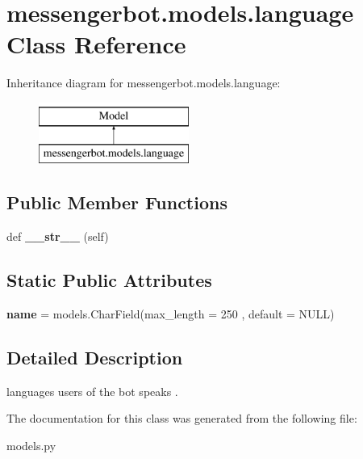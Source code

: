 \hypertarget{classmessengerbot_1_1models_1_1language}{}\section{messengerbot.\+models.\+language Class Reference}
\label{classmessengerbot_1_1models_1_1language}
Inheritance diagram for messengerbot.\+models.\+language\+:\begin{figure}[H]
\begin{center}
\leavevmode
\includegraphics[height=2.000000cm]{classmessengerbot_1_1models_1_1language}
\end{center}
\end{figure}
\subsection*{Public Member Functions}
\begin{DoxyCompactItemize}
\item 
\mbox{\label{classmessengerbot_1_1models_1_1language_a0cb14c023495e985949e8403eb4eca88}} 
def {\bfseries \+\_\+\+\_\+str\+\_\+\+\_\+} (self)
\end{DoxyCompactItemize}
\subsection*{Static Public Attributes}
\begin{DoxyCompactItemize}
\item 
\mbox{\label{classmessengerbot_1_1models_1_1language_ae12a1e259f788f923b5eb031021f507d}} 
{\bfseries name} = models.\+Char\+Field(max\+\_\+length = 250 , default = \textquotesingle{}N\+U\+LL\textquotesingle{})
\end{DoxyCompactItemize}


\subsection{Detailed Description}
\begin{DoxyVerb}languages users of the bot speaks . \end{DoxyVerb}
 

The documentation for this class was generated from the following file\+:\begin{DoxyCompactItemize}
\item 
models.\+py\end{DoxyCompactItemize}
